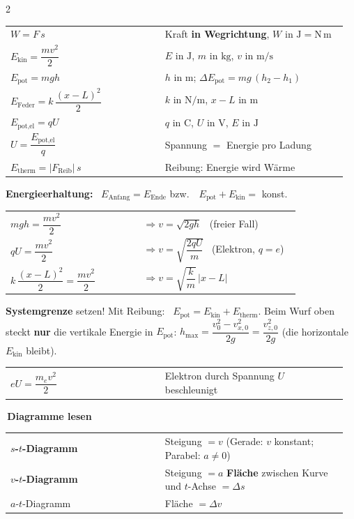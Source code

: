 \documentclass[8pt,a4paper]{extarticle}
\makeatletter
\newcommand{\T}[1]{%
  \vspace{2.2mm plus 0.6mm}%
  \noindent\colorbox{ak}{\color{white}\bfseries\small\,#1\,}\par
  \vspace{0.8mm}\nobreak\ignorespaces}
\newcommand{\FT}[1]{%
  \begin{tabular}{@{}>{\raggedright\arraybackslash}p{0.44\linewidth}@{\hspace{3pt}}>{\raggedright\arraybackslash}p{0.52\linewidth}@{}}
  #1\end{tabular}\par}
\newcommand{\hk}[1]{\textcolor{ak}{\textbf{#1}}}
\makeatother
\begin{document}
\begin{multicols}{2}
\FT{
$W = F\,s$ & Kraft \textbf{in Wegrichtung}, $W$ in $\mathrm{J}=\mathrm{N\,m}$ \\
$E_{\text{kin}} = \dfrac{mv^2}{2}$ & $E$ in $\mathrm{J}$, $m$ in $\mathrm{kg}$, $v$ in $\mathrm{m/s}$ \\
$E_{\text{pot}} = mgh$ & $h$ in $\mathrm{m}$; $\Delta E_{\text{pot}} = mg\,(h_2-h_1)$ \\
$E_{\text{Feder}} = k\,\dfrac{(x-L)^2}{2}$ & $k$ in $\mathrm{N/m}$, $x-L$ in $\mathrm{m}$ \\
$E_{\text{pot,el}} = qU$ & $q$ in $\mathrm{C}$, $U$ in $\mathrm{V}$, $E$ in $\mathrm{J}$ \\
$U = \dfrac{E_{\text{pot,el}}}{q}$ & Spannung $=$ Energie pro Ladung \\
$E_{\text{therm}} = |F_{\text{Reib}}|\,s$ & Reibung: Energie wird Wärme \\
}

\vspace{0.8mm}
\hk{Energieerhaltung:} \ $E_{\text{Anfang}} = E_{\text{Ende}}$ \quad bzw.\ \ $E_{\text{pot}}+E_{\text{kin}} = $ konst.

\FT{
$mgh = \dfrac{mv^2}{2}$ & $\Rightarrow v=\sqrt{2gh}$ \ (freier Fall) \\
$qU = \dfrac{mv^2}{2}$ & $\Rightarrow v=\sqrt{\dfrac{2qU}{m}}$ \ (Elektron, $q=e$) \\
$k\,\dfrac{(x-L)^2}{2} = \dfrac{mv^2}{2}$ & $\Rightarrow v = \sqrt{\dfrac{k}{m}}\,|x-L|$ \\
}

\vspace{0.8mm}
\hk{Systemgrenze} setzen! Mit Reibung: \ $E_{\text{pot}} = E_{\text{kin}} + E_{\text{therm}}$.
Beim Wurf oben steckt \textbf{nur} die vertikale Energie in $E_{\text{pot}}$:
$h_{\text{max}} = \dfrac{v_0^2-v_{x,0}^2}{2g} = \dfrac{v_{z,0}^2}{2g}$ (die horizontale $E_{\text{kin}}$ bleibt).

\FT{
$eU = \dfrac{m_ev^2}{2}$ & Elektron durch Spannung $U$ beschleunigt \\
}

\columnbreak
\T{Diagramme lesen}

\FT{
\hk{$s$-$t$-Diagramm} & Steigung $= v$ (Gerade: $v$ konstant; Parabel: $a\neq0$) \\
\hk{$v$-$t$-Diagramm} & Steigung $= a$ \quad \textbf{Fläche} zwischen Kurve und $t$-Achse $=\Delta s$ \\
$a$-$t$-Diagramm & Fläche $=\Delta v$ \\
}


\end{multicols}
\end{document}
